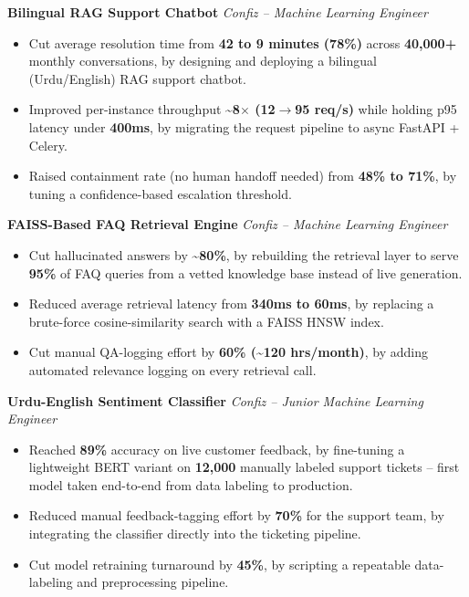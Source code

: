 \documentclass[10.5pt,letterpaper]{article}
\newcommand{\projheader}[3]{%
  \textbf{#1} \hfill \textit{#2 -- #3}%
}
\begin{document}
\vspace{5pt}
\projheader{Bilingual RAG Support Chatbot}{Confiz}{Machine Learning Engineer}
\begin{itemize}
  \item Cut average resolution time from \textbf{42 to 9 minutes (78\%)} across \textbf{40,000+} monthly conversations, by designing and deploying a bilingual (Urdu/English) RAG support chatbot.
  \item Improved per-instance throughput \textbf{\textasciitilde8$\times$ (12$\rightarrow$95 req/s)} while holding p95 latency under \textbf{400ms}, by migrating the request pipeline to async FastAPI + Celery.
  \item Raised containment rate (no human handoff needed) from \textbf{48\% to 71\%}, by tuning a confidence-based escalation threshold.
\end{itemize}

\vspace{5pt}
\projheader{FAISS-Based FAQ Retrieval Engine}{Confiz}{Machine Learning Engineer}
\begin{itemize}
  \item Cut hallucinated answers by \textbf{\textasciitilde80\%}, by rebuilding the retrieval layer to serve \textbf{95\%} of FAQ queries from a vetted knowledge base instead of live generation.
  \item Reduced average retrieval latency from \textbf{340ms to 60ms}, by replacing a brute-force cosine-similarity search with a FAISS HNSW index.
  \item Cut manual QA-logging effort by \textbf{60\% (\textasciitilde120 hrs/month)}, by adding automated relevance logging on every retrieval call.
\end{itemize}

\vspace{5pt}
\projheader{Urdu-English Sentiment Classifier}{Confiz}{Junior Machine Learning Engineer}
\begin{itemize}
  \item Reached \textbf{89\%} accuracy on live customer feedback, by fine-tuning a lightweight BERT variant on \textbf{12,000} manually labeled support tickets -- first model taken end-to-end from data labeling to production.
  \item Reduced manual feedback-tagging effort by \textbf{70\%} for the support team, by integrating the classifier directly into the ticketing pipeline.
  \item Cut model retraining turnaround by \textbf{45\%}, by scripting a repeatable data-labeling and preprocessing pipeline.
\end{itemize}
\end{document}
